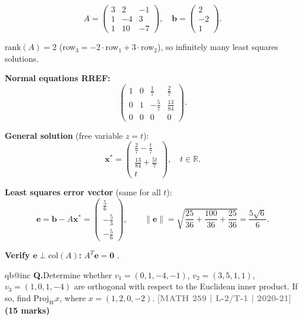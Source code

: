 \documentclass[12pt,a3paper]{article}
\makeatletter
\newcommand{\yr}[1]{\hfill\textcolor{gray}{\small\textbf{[#1]}}}
\newcommand{\mk}[1]{\textcolor{orange!70!black}{\small\textbf{(#1 marks)}}}
\newcounter{qnum}
\newcommand{\Q}[1]{%
  \csname qb@inc\endcsname
  \needspace{4\baselineskip}
  \refstepcounter{qnum}
  \vspace{6pt}
  \noindent\textbf{Q\theqnum.}\enspace #1\par
}
\makeatother
\begin{document}
\begin{tcolorbox}[enhanced,breakable,
  colback=cD!4,colframe=cD,boxrule=0.8pt,arc=5pt,
  title={\textbf{Answer --- Least Squares: $3x+2y-z=2,\;x-4y+3z=-2,\;x+10y-7z=1$}},
  fonttitle=\bfseries\color{white},colbacktitle=cD]

\[
A=\begin{pmatrix}3&2&-1\\1&-4&3\\1&10&-7\end{pmatrix},\quad
\mathbf{b}=\begin{pmatrix}2\\-2\\1\end{pmatrix}.
\]

$\mathrm{rank}(A)=2$ (row$_3=-2\cdot$row$_1+3\cdot$row$_2$), so infinitely many least squares solutions.

\textbf{Normal equations RREF:}
\[
\begin{pmatrix}1&0&\frac{1}{7}&\frac{2}{7}\\0&1&-\frac{5}{7}&\frac{13}{84}\\0&0&0&0\end{pmatrix}.
\]

\textbf{General solution} (free variable $z=t$):
\[
\mathbf{x}^*=\begin{pmatrix}\frac{2}{7}-\frac{t}{7}\\[4pt]\frac{13}{84}+\frac{5t}{7}\\[4pt]t\end{pmatrix},\quad t\in\mathbb{R}.
\]

\textbf{Least squares error vector} (same for all $t$):
\[
\mathbf{e}=\mathbf{b}-A\mathbf{x}^*=\begin{pmatrix}\frac{5}{6}\\[4pt]-\frac{5}{3}\\[4pt]-\frac{5}{6}\end{pmatrix},\qquad
\|\mathbf{e}\|=\sqrt{\frac{25}{36}+\frac{100}{36}+\frac{25}{36}}=\frac{5\sqrt{6}}{6}.
\]

\textbf{Verify $\mathbf{e}\perp\mathrm{col}(A)$:} $A^T\mathbf{e}=\mathbf{0}$ . \checkmark

\end{tcolorbox}


\Q{Determine whether $v_1 = (0,1,-4,-1)$, $v_2 = (3,5,1,1)$, $v_3 = (1,0,1,-4)$ are orthogonal with respect to the Euclidean inner product. If so, find $\mathrm{Proj}_W x$, where $x = (1,2,0,-2)$.
\yr{MATH 259 | L-2/T-1 | 2020-21} \mk{15}}
\end{document}
